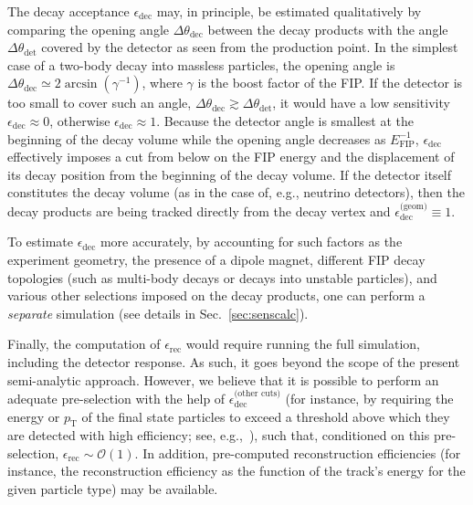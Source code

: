 \documentclass[
    aps,prd,
    twocolumn,
    nofootinbib,
    superscriptaddress,
]{revtex4}
\begin{document}
The decay acceptance $\epsilon_{\text{dec}}$ may, in principle, be estimated qualitatively by comparing the opening angle $\Delta \theta_{\text{dec}}$ between the decay products with the angle $\Delta \theta_{\text{det}}$ covered by the detector as seen from the production point. In the simplest case of a two-body decay into massless particles, the opening angle is $\Delta \theta_{\text{dec}} \simeq 2\arcsin(\gamma^{-1})$, where $\gamma$ is the boost factor of the FIP. If the detector is too small to cover such an angle, $\Delta \theta_{\text{dec}} \gtrsim \Delta \theta_{\text{det}}$,  it would have a low sensitivity $\epsilon_{\text{dec}}\approx 0$, otherwise $\epsilon_{\text{dec}}\approx 1$. Because the detector angle is smallest at the beginning of the decay volume while the opening angle decreases as $E_{\text{FIP}}^{-1}$, $\epsilon_{\text{dec}}$ effectively imposes a cut from below on the FIP energy and the displacement of its decay position from the beginning of the decay volume. If the detector itself constitutes the decay volume (as in the case of, e.g., neutrino detectors), then the decay products are being tracked directly from the decay vertex and $\epsilon_{\text{dec}}^{\text{(geom)}}\equiv 1$.

To estimate $\epsilon_{\text{dec}}$ more accurately, by accounting for such factors as the experiment geometry, the presence of a dipole magnet, different FIP decay topologies (such as multi-body decays or decays into unstable particles), and various other selections imposed on the decay products, one can perform a \emph{separate} simulation (see details in Sec.~\ref{sec:senscalc}).

Finally, the computation of $\epsilon_{\text{rec}}$ would require running the full simulation, including the detector response. As such, it goes beyond the scope of the present semi-analytic approach. However, we believe that it is possible to perform an adequate pre-selection with the help of $\epsilon_{\text{dec}}^{\text{(other cuts)}}$ (for instance, by requiring the energy or $p_{\mathrm{T}}$ of the final state particles to exceed a threshold above which they are detected with high efficiency; see, e.g.,~\cite{Aberle:2839677}), such that, conditioned on this pre-selection, $\epsilon_{\text{rec}} \sim \mathcal{O}(1)$. In addition, pre-computed reconstruction efficiencies (for instance, the reconstruction efficiency as the function of the track's energy for the given particle type) may be available.
\end{document}
